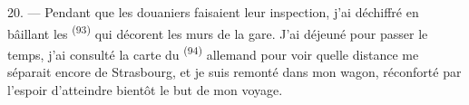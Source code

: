 20. --- Pendant que les douaniers faisaient leur inspection, j'ai déchiffré en
bâillant les  \textsuperscript{(93)} qui décorent les murs de la
gare. J'ai déjeuné pour passer le temps, j'ai consulté la carte du
 \textsuperscript{(94)} allemand pour voir quelle distance me
séparait encore de Strasbourg, et je suis remonté dans mon wagon, réconforté par
l'espoir d'atteindre bientôt le but de mon voyage.
\VUsaut{6.0mm}
\VUfilet{22mm}
